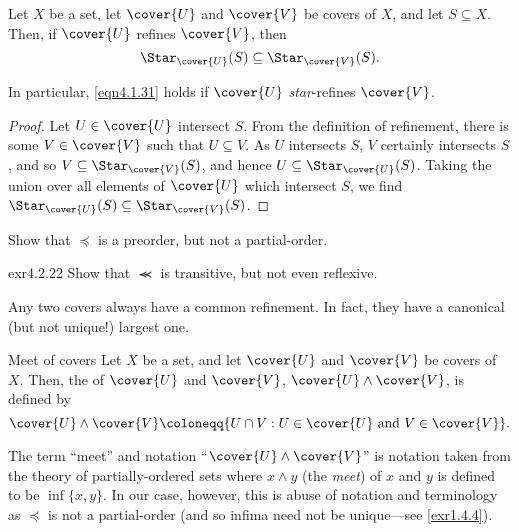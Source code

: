 \begin{prp}{}{}
Let $X$ be a set, let $\cover{U}$ and $\cover{V}$ be covers of $X$, and let $S\subseteq X$.  Then, if $\cover{U}$ refines $\cover{V}$, then
\begin{equation}\label{eqn4.1.31}
\Star _{\cover{U}}(S)\subseteq \Star _{\cover{V}}(S).
\end{equation}
\begin{rmk}
In particular, \eqref{eqn4.1.31} holds if $\cover{U}$ \emph{star}-refines $\cover{V}$.
\end{rmk}
\begin{proof}
Let $U\in \cover{U}$ intersect $S$.  From the definition of refinement, there is some $V\in \cover{V}$ such that $U\subseteq V$.  As $U$ intersects $S$, $V$ certainly intersects $S$, and so $V\subseteq \Star _{\cover{V}}(S)$, and hence $U\subseteq \Star _{\cover{U}}(S)$.  Taking the union over all elements of $\cover{U}$ which intersect $S$, we find $\Star _{\cover{U}}(S)\subseteq \Star _{\cover{V}}(S)$.
\end{proof}
\end{prp}
\begin{exr}{}{}
Show that $\preceq$ is a preorder, but not a partial-order.
\end{exr}
\begin{exr}{}{exr4.2.22}
Show that $\llcurly$ is transitive, but not even reflexive.
\end{exr}
Any two covers always have a common refinement.  In fact, they have a canonical (but not unique!) largest one.
\begin{dfn}{Meet of covers}{}
Let $X$ be a set, and let $\cover{U}$ and $\cover{V}$ be covers of $X$.  Then, the  of $\cover{U}$ and $\cover{V}$, $\cover{U}\wedge \cover{V}$, is defined by
\begin{equation}
\cover{U}\wedge \cover{V}\coloneqq \{ U\cap V:U\in \cover{U}\text{ and }V\in \cover{V}\} .
\end{equation}
\begin{rmk}
The term ``meet'' and notation ``$\cover{U}\wedge \cover{V}$'' is notation taken from the theory of partially-ordered sets where $x\wedge y$ (the \emph{meet}) of $x$ and $y$ is defined to be $\inf \{ x,y\}$.  In our case, however, this is abuse of notation and terminology as $\preceq$ is not a partial-order (and so infima need not be unique---see \cref{exr1.4.4}).
\end{rmk}
\end{dfn}
